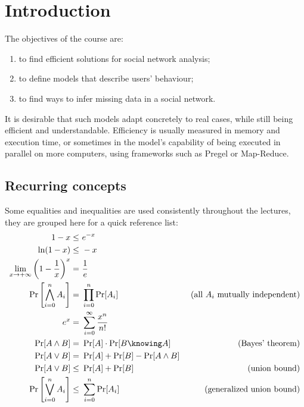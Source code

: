 \chapter{Introduction}
    
The objectives of the course are:
\begin{enumerate}
    \item to find efficient solutions for social network analysis;
    \item to define models that describe users' behaviour;
    \item to find ways to infer missing data in a social network.
\end{enumerate}

It is desirable that such models adapt concretely to real cases, while still being efficient and understandable. Efficiency is usually measured in memory and execution time, or sometimes in the model's capability of being executed in parallel on more computers, using frameworks such as Pregel or Map-Reduce.


\section{Recurring concepts}

Some equalities and inequalities are used consistently throughout the lectures, they are grouped here for a quick reference list:
\begin{align}
    1 - x \leq&\ e^{-x}                                                 & \label{eq:e-x}                                    \\
    \ln(1 - x) \leq&\ -x                                                & \label{eq:ln-1-x}                                 \\
    \lim_{x \to +\infty} \left(1 - \frac{1}{x}\right)^x =&\ \frac{1}{e} & \label{eq:limit-1/e}                              \\
    \Pr\left[\bigwedge_{i=0}^n A_i\right] =&\ \prod_{i=0}^{n}\Pr[A_i]   & \text{(all } A_i \text{ mutually independent)}    \label{eq:prob} \\
    e^x =&\ \sum_{i = 0}^{\infty} \frac{x^n}{n!}                        & \label{eq:epow}                                   \\
    \Pr[A \wedge B] =&\ \Pr[A] \cdot \Pr[B \knowing A]                  & \tag{Bayes' theorem}                              \label{eq-bayes} \\
    \Pr[A \vee B] =&\ \Pr[A] + \Pr[B] - \Pr[A \wedge B]                 & \label{eq:prob-or}                                \\
    \Pr[A \vee B] \leq&\ \Pr[A] + \Pr[B]                                & \tag{union bound}                                 \label{eq:union-bound} \\
    \Pr\left[\bigvee_{i = 0}^n A_i\right] \leq&\ \sum_{i = 0}^{n}\Pr[A_i]          & \tag{generalized union bound}                     \label{eq:union-bound-gen}
\end{align}


